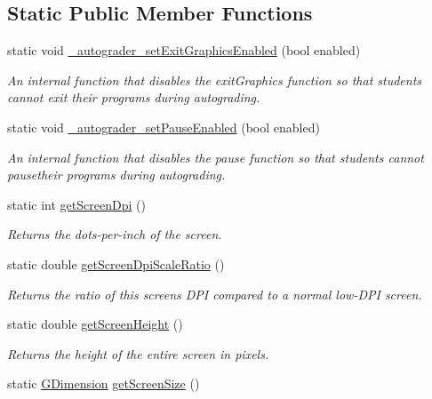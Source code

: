 \subsection*{Static Public Member Functions}
\begin{DoxyCompactItemize}
\item 
static void \mbox{\hyperlink{classGWindow_a2e528e6ab0611fb2bd33810b4a610403}{\+\_\+autograder\+\_\+set\+Exit\+Graphics\+Enabled}} (bool enabled)
\begin{DoxyCompactList}\small\item\em An internal function that disables the exit\+Graphics function so that students cannot exit their programs during autograding. \end{DoxyCompactList}\item 
static void \mbox{\hyperlink{classGWindow_ae51372f06b62dd7ffef8678b147cc70a}{\+\_\+autograder\+\_\+set\+Pause\+Enabled}} (bool enabled)
\begin{DoxyCompactList}\small\item\em An internal function that disables the pause function so that students cannot pausetheir programs during autograding. \end{DoxyCompactList}\item 
static int \mbox{\hyperlink{classGWindow_aea783b75281f864f14e958d2fee28f9d}{get\+Screen\+Dpi}} ()
\begin{DoxyCompactList}\small\item\em Returns the dots-\/per-\/inch of the screen. \end{DoxyCompactList}\item 
static double \mbox{\hyperlink{classGWindow_ab15179b683630109f0ac256590a3b323}{get\+Screen\+Dpi\+Scale\+Ratio}} ()
\begin{DoxyCompactList}\small\item\em Returns the ratio of this screen\textquotesingle{}s D\+PI compared to a normal low-\/\+D\+PI screen. \end{DoxyCompactList}\item 
static double \mbox{\hyperlink{classGWindow_a9942379fdf4fb4445c35eaf3390b7ccb}{get\+Screen\+Height}} ()
\begin{DoxyCompactList}\small\item\em Returns the height of the entire screen in pixels. \end{DoxyCompactList}\item 
static \mbox{\hyperlink{classGDimension}{G\+Dimension}} \mbox{\hyperlink{classGWindow_ae3d08d5cde8163274459797770596809}{get\+Screen\+Size}} ()

\end{DoxyCompactItemize}
